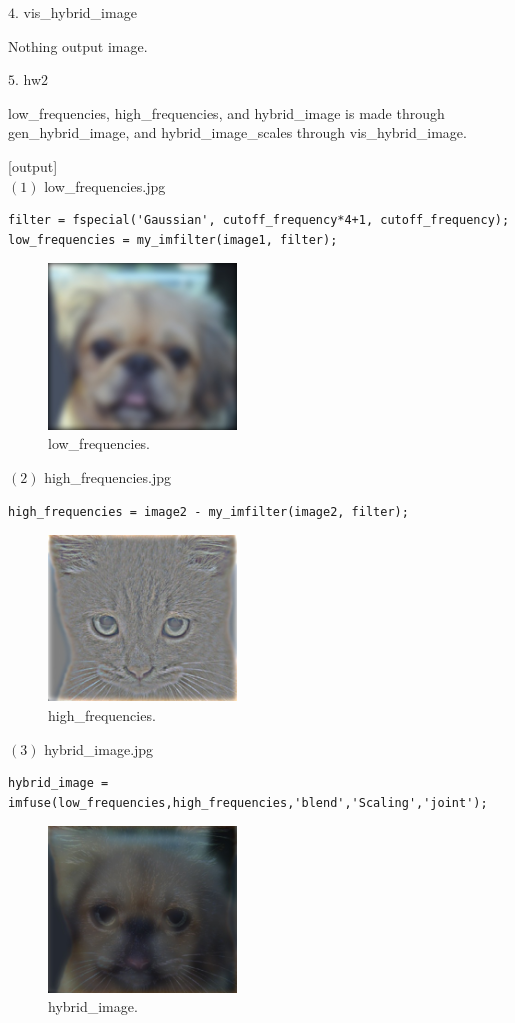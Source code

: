 {\large $4.$ vis\_hybrid\_image \par}
\tab Nothing output image. 

\pagebreak
{\large $5.$ hw$2$  \par}
low\_frequencies, high\_frequencies, and hybrid\_image is made through gen\_hybrid\_image, and hybrid\_image\_scales through vis\_hybrid\_image.

[output] \\
$(1)$ low\_frequencies.jpg
\begin{lstlisting}[style=Matlab-editor]
filter = fspecial('Gaussian', cutoff_frequency*4+1, cutoff_frequency);
low_frequencies = my_imfilter(image1, filter);
\end{lstlisting}
\begin{figure}[!h]
    \centering
    \includegraphics[width=5cm]{low_frequencies.jpg}
    \caption{low\_frequencies.}
    \label{fig:result1}
\end{figure}

$(2)$ high\_frequencies.jpg
\begin{lstlisting}[style=Matlab-editor]
high_frequencies = image2 - my_imfilter(image2, filter);
\end{lstlisting}
\begin{figure}[!h]
    \centering
    \includegraphics[width=5cm]{high_frequencies.jpg}
    \caption{high\_frequencies.}
    \label{fig:result2}
\end{figure}
\pagebreak
$(3)$ hybrid\_image.jpg
\begin{lstlisting}[style=Matlab-editor]
hybrid_image = imfuse(low_frequencies,high_frequencies,'blend','Scaling','joint');
\end{lstlisting}
\begin{figure}[!h]
    \centering
    \includegraphics[width=5cm]{hybrid_image.jpg}
    \caption{hybrid\_image.}
    \label{fig:result3}
\end{figure}

